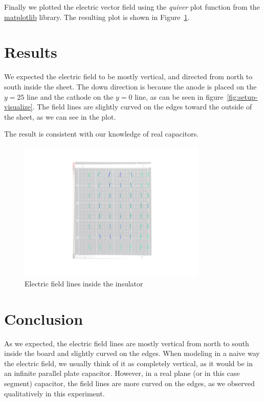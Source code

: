 \documentclass[notitlepage]{report}
\numberwithin{equation}{section}
\theoremstyle{plain}
\theoremstyle{definition}
\theoremstyle{remark}
\begin{document}


Finally we plotted the electric vector field using the \emph{quiver} plot function from
the \href{https://matplotlib.org/}{matplotlib} library. The resulting plot is shown in Figure~\ref{fig:field}.
\section{Results}
We expected the electric field to be mostly vertical, and directed from north to
south inside the sheet. The down direction is because the anode is placed on
the \(y=25\) line and the cathode on the \(y=0\) line, as can be seen in
figure~\ref{fig:setup-visualize}. The field lines are slightly curved on the
edges toward the outside of the sheet, as we can see in the plot.

The result is consistent with our knowledge of real capacitors.

\begin{figure}[h!t]
    \centering
    \includegraphics[width=0.8\textwidth]{figures/field.png}
    \caption{Electric field lines inside the insulator}\label{fig:field}
\end{figure}

\section{Conclusion}
As we expected, the electric field lines are mostly vertical from north to south
inside the board and slightly curved on the edges. 
When modeling in a naive way the electric field, we usually think of it as
completely vertical, as it would be in an infinite parallel plate capacitor.
However, in a real plane (or in this case segment) capacitor, the field lines
are more curved on the edges, as we observed qualitatively in this experiment. 
\end{document}
